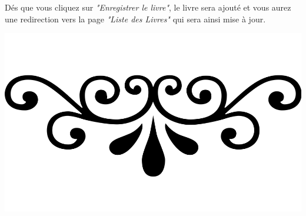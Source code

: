 \documentclass{report}
\begin{document}
		D\'{e}s que vous cliquez sur \textit{"Enregistrer le livre"}, le livre sera ajout\'{e} et vous aurez une redirection vers la page \textit{"Liste des Livres"} qui sera ainsi mise \`{a} jour.
		
		\begin{center}
		\includegraphics[scale=0.1]{img/fioritures.png} 
		\end{center} 
	
\end{document}
